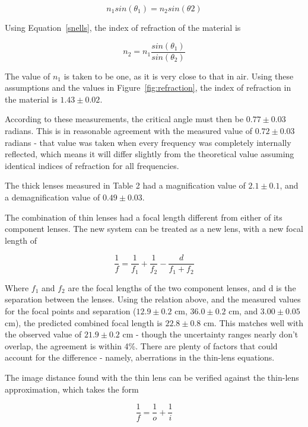 \documentclass[journal]{IEEEtran}
\begin{document}
\begin{equation}
\label{snells}
n_1 sin(\theta _1) = n_2 sin(\theta 2)
\end{equation}

Using Equation~\ref{snells}, the index of refraction of the material is

\begin{displaymath}
n_2 = n_1 \frac{sin(\theta _1)}{sin(\theta _2)}
\end{displaymath}

The value of $n_1$ is taken to be one, as it is very close to that in air.
Using these assumptions and the values in Figure~\ref{fig:refraction}, the
index of refraction in the material is $1.43 \pm 0.02$.

According to these measurements, the critical angle must then be $0.77 \pm
0.03$ radians. This is in reasonable agreement with the measured value of $0.72
\pm 0.03$ radians - that value was taken when every frequency was completely
internally reflected, which means it will differ slightly from the theoretical
value assuming identical indices of refraction for all frequencies.

The thick lenses measured in Table 2 had a magnification value of $2.1 \pm
0.1$, and a demagnification value of $0.49 \pm 0.03$.

The combination of thin lenses had a focal length different from either of its
component lenses. The new system can be treated as a new lens, with a new focal
length of

\begin{displaymath}
\frac{1}{f} = \frac{1}{f_1} + \frac{1}{f_2} - \frac{d}{f_1 + f_2}
\end{displaymath}

Where $f_1$ and $f_2$ are the focal lengths of the two component lenses, and d
is the separation between the lenses. Using the relation above, and the
measured values for the focal points and separation ($12.9 \pm 0.2$ cm, $36.0
\pm 0.2$ cm, and $3.00 \pm 0.05$ cm), the predicted combined focal length is
$22.8 \pm 0.8$ cm. This matches well with the observed value of $21.9 \pm 0.2$
cm - though the uncertainty ranges nearly don't overlap, the agreement is
within 4\%. There are plenty of factors that could account for the difference -
namely, aberrations in the thin-lens equations.

The image distance found with the thin lens can be verified against the
thin-lens approximation, which takes the form

\begin{displaymath}
\frac{1}{f} = \frac{1}{o} + \frac{1}{i}
\end{displaymath}
\end{document}
